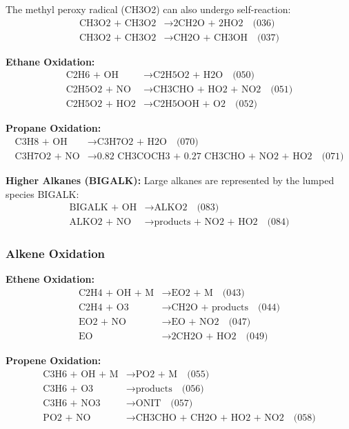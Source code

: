 \documentclass[12pt,a4paper]{article}
\begin{document}
The methyl peroxy radical (CH3O2) can also undergo self-reaction:
\begin{align}
\text{CH3O2 + CH3O2} &\rightarrow \text{2CH2O + 2HO2} \quad \text{(036)} \\
\text{CH3O2 + CH3O2} &\rightarrow \text{CH2O + CH3OH} \quad \text{(037)}
\end{align}

\textbf{Ethane Oxidation:}
\begin{align}
\text{C2H6 + OH} &\rightarrow \text{C2H5O2 + H2O} \quad \text{(050)} \\
\text{C2H5O2 + NO} &\rightarrow \text{CH3CHO + HO2 + NO2} \quad \text{(051)} \\
\text{C2H5O2 + HO2} &\rightarrow \text{C2H5OOH + O2} \quad \text{(052)}
\end{align}

\textbf{Propane Oxidation:}
\begin{align}
\text{C3H8 + OH} &\rightarrow \text{C3H7O2 + H2O} \quad \text{(070)} \\
\text{C3H7O2 + NO} &\rightarrow \text{0.82 CH3COCH3 + 0.27 CH3CHO + NO2 + HO2} \quad \text{(071)}
\end{align}

\textbf{Higher Alkanes (BIGALK):}
Large alkanes are represented by the lumped species BIGALK:
\begin{align}
\text{BIGALK + OH} &\rightarrow \text{ALKO2} \quad \text{(083)} \\
\text{ALKO2 + NO} &\rightarrow \text{products + NO2 + HO2} \quad \text{(084)}
\end{align}

\subsubsection{Alkene Oxidation}

\textbf{Ethene Oxidation:}
\begin{align}
\text{C2H4 + OH + M} &\rightarrow \text{EO2 + M} \quad \text{(043)} \\
\text{C2H4 + O3} &\rightarrow \text{CH2O + products} \quad \text{(044)} \\
\text{EO2 + NO} &\rightarrow \text{EO + NO2} \quad \text{(047)} \\
\text{EO} &\rightarrow \text{2CH2O + HO2} \quad \text{(049)}
\end{align}

\textbf{Propene Oxidation:}
\begin{align}
\text{C3H6 + OH + M} &\rightarrow \text{PO2 + M} \quad \text{(055)} \\
\text{C3H6 + O3} &\rightarrow \text{products} \quad \text{(056)} \\
\text{C3H6 + NO3} &\rightarrow \text{ONIT} \quad \text{(057)} \\
\text{PO2 + NO} &\rightarrow \text{CH3CHO + CH2O + HO2 + NO2} \quad \text{(058)}
\end{align}
\end{document}
